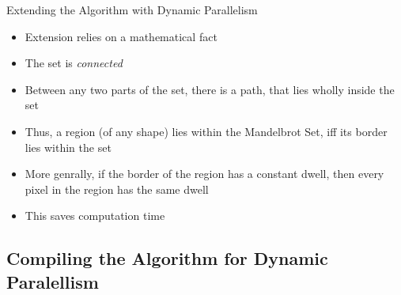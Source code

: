 \documentclass[fleqn,11pt,aspectratio=43]{beamer}
\begin{document}
\begin{frame}{Extending the Algorithm with Dynamic Parallelism}
	\begin{itemize}
		\item Extension relies on a mathematical fact
		\item The set is \textit{connected}
		\item Between any two parts of the set, there is a path, that lies wholly inside the set
		\item Thus, a region (of any shape) lies within the Mandelbrot Set, iff its border lies within the set
		\item More genrally, if the border of the region has a constant dwell, then every pixel in the region has the same dwell
		\item This saves computation time
	\end{itemize}
\end{frame}

\subsection{Compiling the Algorithm for Dynamic Paralellism}
\end{document}
